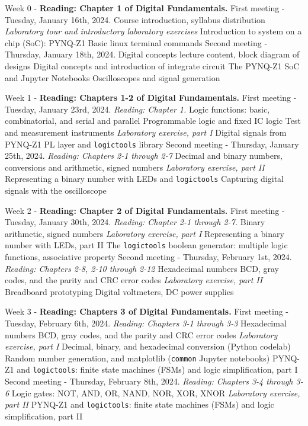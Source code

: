 \documentclass[10pt]{article}
\begin{document}
\begin{outline}[enumerate]

\1 Week 0 - \textbf{Reading: Chapter 1 of Digital Fundamentals.}
\2 First meeting - Tuesday, January 16th, 2024.
\3 Course introduction, syllabus distribution
\3 \textit{Laboratory tour and introductory laboratory exercises}
\4 Introduction to system on a chip (SoC): PYNQ-Z1
\4 Basic linux terminal commands
\2 Second meeting - Thursday, January 18th, 2024.
\3 Digital concepts lecture content, block diagram of designs
\3 Digital concepts and introduction of integrate circuit
\4 The PYNQ-Z1 SoC and Jupyter Notebooks
\4 Oscilloscopes and signal generation

\1 Week 1 - \textbf{Reading: Chapters 1-2 of Digital Fundamentals.}
\2 First meeting - Tuesday, January 23rd, 2024. \textit{Reading: Chapter 1.}
\3 Logic functions: basic, combinatorial, and serial and parallel
\3 Programmable logic and fixed IC logic
\3 Test and measurement instruments
\3 \textit{Laboratory exercise, part I}
\4 Digital signals from PYNQ-Z1
\4 PL layer and \verb+logictools+ library
\2 Second meeting - Thursday, January 25th, 2024. \textit{Reading: Chapters 2-1 through 2-7}
\3 Decimal and binary numbers, conversions and arithmetic, signed numbers
\3 \textit{Laboratory exercise, part II}
\4 Representing a binary number with LEDs and \verb+logictools+
\4 Capturing digital signals with the oscilloscope

\1 Week 2 - \textbf{Reading: Chapter 2 of Digital Fundamentals.}
\2 First meeting - Tuesday, January 30th, 2024. \textit{Reading: Chapter 2-1 through 2-7.}
\3 Binary arithmetic, signed numbers
\3 \textit{Laboratory exercise, part I}
\4 Representing a binary number with LEDs, part II
\4 The \verb+logictools+ boolean generator: multiple logic functions, associative property
\2 Second meeting - Thursday, February 1st, 2024. \textit{Reading: Chapters 2-8, 2-10 through 2-12}
\3 Hexadecimal numbers
\3 BCD, gray codes, and the parity and CRC error codes
\3 \textit{Laboratory exercise, part II}
\4 Breadboard prototyping
\4 Digital voltmeters, DC power supplies

\clearpage

\1 Week 3 - \textbf{Reading: Chapters 3 of Digital Fundamentals.}
\2 First meeting - Tuesday, February 6th, 2024.  \textit{Reading: Chapters 3-1 through 3-3}
\3 Hexadecimal numbers
\3 BCD, gray codes, and the parity and CRC error codes
\3 \textit{Laboratory exercise, part I}
\4 Decimal, binary, and hexadecimal conversion (Python codelab)
\4 Random number generation, and matplotlib (\verb+common+ Jupyter notebooks)
\4 PYNQ-Z1 and \verb+logictools+: finite state machines (FSMs) and logic simplification, part I
\2 Second meeting - Thursday, February 8th, 2024. \textit{Reading: Chapters 3-4 through 3-6}
\3 Logic gates: NOT, AND, OR, NAND, NOR, XOR, XNOR
\3 \textit{Laboratory exercise, part II}
\4 PYNQ-Z1 and \verb+logictools+: finite state machines (FSMs) and logic simplification, part II


\end{outline}
\end{document}
